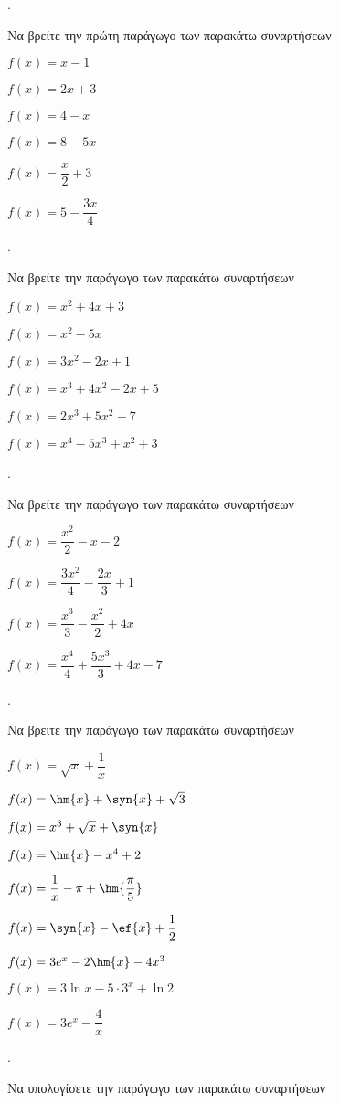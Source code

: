 \documentclass[11pt,a4paper,twocolumn]{article}
\newcounter{askhsh}
\newcommand{\askhsh}{{\large\theaskhsh.}\ \addtocounter{askhsh}{1}}
\begin{document}
\askhsh Να βρείτε την πρώτη παράγωγο των παρακάτω συναρτήσεων
\begin{alist}
\begin{multicols}{2}
\item $ f(x)=x-1 $
\item $ f(x)=2x+3 $
\item $ f(x)=4-x $
\item $ f(x)=8-5x $
\item $ f(x)=\dfrac{x}{2}+3 $
\item $ f(x)=5-\dfrac{3x}{4} $
\end{multicols}
\end{alist}
\askhsh Να βρείτε την παράγωγο των παρακάτω συναρτήσεων
\begin{alist}
\item $ f(x)=x^2+4x+3 $
\item $ f(x)=x^2-5x $
\item $ f(x)=3x^2-2x+1 $
\item $ f(x)=x^3+4x^2-2x+5 $
\item $ f(x)=2x^3+5x^2-7 $
\item $ f(x)=x^4-5x^3+x^2+3 $
\end{alist}
\askhsh Να βρείτε την παράγωγο των παρακάτω συναρτήσεων
\begin{alist}
\item $ f(x)=\dfrac{x^2}{2}-x-2 $
\item $ f(x)=\dfrac{3x^2}{4}-\dfrac{2x}{3}+1 $
\item $ f(x)=\dfrac{x^3}{3}-\dfrac{x^2}{2}+4x $
\item $ f(x)=\dfrac{x^4}{4}+\dfrac{5x^3}{3}+4x-7 $
\end{alist}
\askhsh Να βρείτε την παράγωγο των παρακάτω συναρτήσεων
\begin{alist}
\item $ f(x)=\sqrt{x}+\dfrac{1}{x} $
\item $ f(x)=\hm{x}+\syn{x}+\sqrt{3} $
\item $ f(x)=x^3+\sqrt{x}+\syn{x} $
\item $ f(x)=\hm{x}-x^4+2 $
\item $ f(x)=\dfrac{1}{x}-\pi+\hm{\dfrac{\pi}{5}} $
\item $ f(x)=\syn{x}-\ef{x}+\dfrac{1}{2} $
\item $ f(x)=3e^x-2\hm{x}-4x^3$
\item $ f(x)=3\ln{x}-5\cdot 3^x+\ln{2}$
\item $ f(x)=3e^x-\dfrac{4}{x}$
\end{alist}
\askhsh Να υπολογίσετε την παράγωγο των παρακάτω συναρτήσεων
\end{document}
